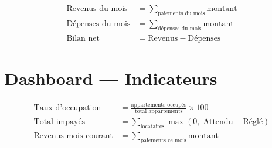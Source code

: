 \documentclass[a4paper,12pt]{article}
\begin{document}
\begin{formulebox}
\begin{align}
\text{Revenus du mois} &= \sum_{\text{paiements du mois}} \text{montant} \\
\text{Dépenses du mois} &= \sum_{\text{dépenses du mois}} \text{montant} \\
\text{Bilan net} &= \text{Revenus} - \text{Dépenses}
\end{align}
\end{formulebox}

\section{Dashboard — Indicateurs}

\begin{formulebox}
\begin{align}
\text{Taux d'occupation} &= \frac{\text{appartements occupés}}{\text{total appartements}} \times 100 \\
\text{Total impayés} &= \sum_{\text{locataires}} \max(0,\; \text{Attendu} - \text{Réglé}) \\
\text{Revenus mois courant} &= \sum_{\text{paiements ce mois}} \text{montant}
\end{align}
\end{formulebox}
\end{document}
